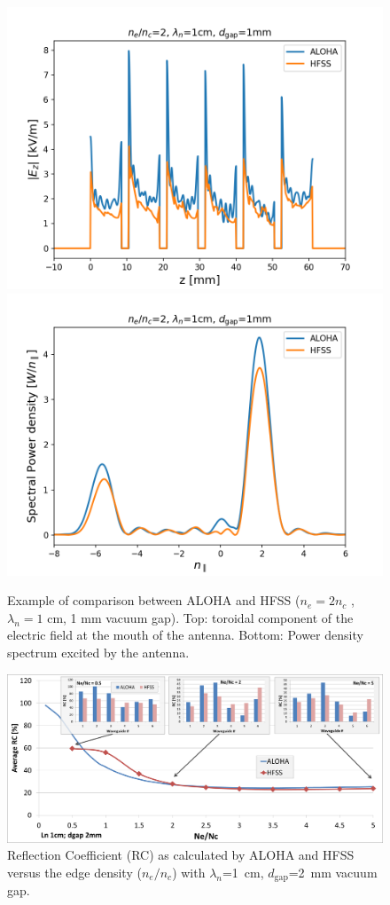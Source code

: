 \begin{figure}[h]
	\centering
	\includegraphics[width=0.8\linewidth]{figures/chap2/LHCD/LH_HFSS_vs_ALOHA_Ez}\\
	\includegraphics[width=0.8\linewidth]{figures/chap2/LHCD/LH_HFSS_vs_ALOHA_spectrum}
	\caption{Example of comparison between ALOHA and HFSS ($n_e = 2n_c$ , $\lambda_n=1$ cm, 1 mm vacuum gap).  Top: toroidal component of the electric field at the mouth of the antenna. Bottom: Power density spectrum excited by the antenna.}
	\label{fig:LH_fied_spectrum}
\end{figure}

\begin{figure}[h]
	\centering
	\includegraphics[width=0.98\linewidth]{figures/chap2/LHCD/LH_RC_vs_NeOverNc}
	\caption{Reflection Coefficient (RC) as calculated by ALOHA and HFSS versus the edge density   ($n_e/n_c$) with  $\lambda_n$=1~cm, $d_\mathrm{gap}$=2~mm vacuum gap.}
	\label{fig:LH_RC_vs_NeOverNc}
\end{figure}

